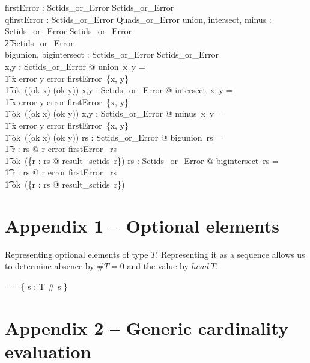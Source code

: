 \documentclass{article}
\begin{document}
\begin{gendef}
   firstError : \power Sctids\_or\_Error \pfun Sctids\_or\_Error \\
   qfirstError : \power Sctids\_or\_Error \pfun Quads\_or\_Error 
\also
   union, intersect, minus : Sctids\_or\_Error \fun Sctids\_or\_Error \fun \\
\t2 Sctids\_or\_Error \\
   bigunion, bigintersect : \power Sctids\_or\_Error \fun Sctids\_or\_Error \\
\where
   \forall x,y : Sctids\_or\_Error @ union~x~y = \\
\t1 \IF x \in \ran error \lor  y \in \ran error \THEN firstError~\{x, y\} \\
\t1 \ELSE ok~((ok \inv x) \cup (ok \inv y))
\also
   \forall x,y : Sctids\_or\_Error @ intersect~x~y = \\
\t1 \IF x \in \ran error \lor y \in \ran error \THEN firstError~\{x, y\} \\
\t1 \ELSE ok~((ok \inv x) \cap (ok \inv y))
\also
   \forall x,y : Sctids\_or\_Error @ minus~x~y = \\
\t1 \IF x \in \ran error \lor y \in \ran error \THEN firstError~\{x, y\} \\
\t1 \ELSE ok~((ok \inv x) \setminus (ok \inv y))
\also
  \forall rs : \power Sctids\_or\_Error @ bigunion~rs = \\
\t1 \IF \exists r : rs @ r \in \ran error \THEN firstError~ rs \\
\t1 \ELSE ok~(\bigcup \{r : rs @ result\_sctids~r\})
\also
  \forall rs : \power Sctids\_or\_Error @ bigintersect~rs = \\
\t1 \IF \exists r : rs @ r \in \ran error \THEN firstError~ rs \\
\t1 \ELSE ok~(\bigcap \{r : rs @ result\_sctids~r\})
\end{gendef}

   

\section{Appendix 1 -- Optional elements}
Representing optional elements of type $T$.  Representing it as a sequence allows us to
determine absence by $\#T = 0$ and the value by $head~T$. 

\begin{zed} 
  \optional[T] == \{ s : \seq T \mid \# s  \} 
\end{zed}

\section{Appendix 2 -- Generic cardinality evaluation}
\end{document}
